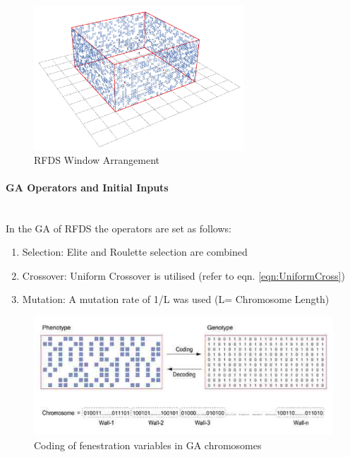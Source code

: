 \begin{figure}[H]
\centering
\includegraphics[width=0.7\textwidth]{./Images/26-RFDSWindows}
\caption[RFDS Window Arrangement]{RFDS Window Arrangement \cite{kawakita08}}
\label{fig:RFDSWin}
\end{figure}

\paragraph{GA Operators and Initial Inputs}\mbox{}\\

In the GA of RFDS the operators are set as follows:

\begin{enumerate}[nolistsep]
\item Selection: Elite and Roulette selection are combined
\item Crossover: Uniform Crossover is utilised (refer to eqn. \ref{eqn:UniformCross})
\item Mutation: A mutation rate of 1/L was used (L= Chromosome Length)
\end{enumerate}

\begin{figure}[hbtp]
\centering
\includegraphics[width=\textwidth]{../Chapter3/Images/17-kawakitaChromo}
\caption[Chromosome Coding]{Coding of fenestration variables in GA chromosomes \cite{kawakita08}}
\label{kawakitaChromo}
\end{figure}

